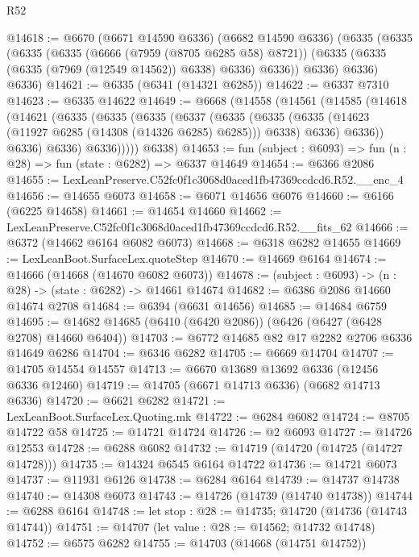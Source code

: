 \begin{lexlean}{R52}
\begin{coremodule}
@14618 := @6670
    (@6671 @14590 @6336)
    (@6682 @14590 @6336)
    (@6335
      (@6335
        (@6335
          (@6335
            (@6666 (@7959 (@8705 @6285 @58) @8721))
            (@6335 (@6335 (@6335 (@7969 (@12549 @14562)) @6338) @6336) @6336))
          @6336)
        @6336)
      @6336)
@14621 := @6335 (@6341 (@14321 @6285))
@14622 := @6337 @7310
@14623 := @6335 @14622
@14649 := @6668
    (@14558
      (@14561
        (@14585
          (@14618
            (@14621
              (@6335
                (@6335
                  (@6335
                    (@6337
                      (@6335
                        (@6335
                          (@6335 (@14623 (@11927 @6285 (@14308 (@14326 @6285) @6285))) @6338)
                          @6336)
                        @6336))
                    @6336)
                  @6336)
                @6336)))))
      @6338)
@14653 := fun (subject : @6093) => fun (n : @28) => fun (state : @6282) => @6337 @14649
@14654 := @6366 @2086
@14655 := LexLeanPreserve.C52fc0f1c3068d0aced1fb47369ccdcd6.R52.__enc_4
@14656 := @14655 @6073
@14658 := @6071 @14656 @6076
@14660 := @6166 (@6225 @14658)
@14661 := @14654 @14660
@14662 := LexLeanPreserve.C52fc0f1c3068d0aced1fb47369ccdcd6.R52.__fits_62
@14666 := @6372 (@14662 @6164 @6082 @6073)
@14668 := @6318 @6282 @14655
@14669 := LexLeanBoot.SurfaceLex.quoteStep
@14670 := @14669 @6164
@14674 := @14666 (@14668 (@14670 @6082 @6073))
@14678 := (subject : @6093) -> (n : @28) -> (state : @6282) -> @14661 @14674
@14682 := @6386 @2086 @14660 @14674 @2708
@14684 := @6394 (@6631 @14656)
@14685 := @14684 @6759
@14695 := @14682 @14685 (@6410 (@6420 @2086)) (@6426 (@6427 (@6428 @2708) @14660 @6404))
@14703 := @6772 @14685 @82 @17 @2282 @2706 @6336 @14649 @6286
@14704 := @6346 @6282
@14705 := @6669 @14704
@14707 := @14705 @14554 @14557
@14713 := @6670 @13689 @13692 @6336 (@12456 @6336 @12460)
@14719 := @14705 (@6671 @14713 @6336) (@6682 @14713 @6336)
@14720 := @6621 @6282
@14721 := LexLeanBoot.SurfaceLex.Quoting.mk
@14722 := @6284 @6082
@14724 := @8705 @14722 @58
@14725 := @14721 @14724
@14726 := @2 @6093
@14727 := @14726 @12553
@14728 := @6288 @6082
@14732 := @14719 (@14720 (@14725 (@14727 @14728)))
@14735 := @14324 @6545 @6164 @14722
@14736 := @14721 @6073
@14737 := @11931 @6126
@14738 := @6284 @6164
@14739 := @14737 @14738
@14740 := @14308 @6073
@14743 := @14726 (@14739 (@14740 @14738))
@14744 := @6288 @6164
@14748 := let stop : @28 := @14735; @14720 (@14736 (@14743 @14744))
@14751 := @14707 (let value : @28 := @14562; @14732 @14748)
@14752 := @6575 @6282
@14755 := @14703 (@14668 (@14751 @14752))

\end{coremodule}
\end{lexlean}
